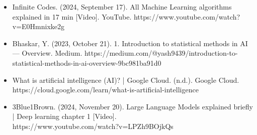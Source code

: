 \documentclass[a4paper]{article}
\begin{document}
\begin{itemize}
    \item Infinite Codes. (2024, September 17). All Machine Learning algorithms explained in 17 min [Video]. YouTube. https://www.youtube.com/watch?v=E0Hmnixke2g

    \item Bhaskar, Y. (2023, October 21). 1. Introduction to statistical methods in AI — Overview. Medium. https://medium.com/@yash9439/introduction-to-statistical-methods-in-ai-overview-9bc981ba91d0

    \item What is artificial intelligence (AI)? | Google Cloud. (n.d.). Google Cloud. \\ https://cloud.google.com/learn/what-is-artificial-intelligence

    \item 3Blue1Brown. (2024, November 20). Large Language Models explained briefly | Deep learning chapter 1 [Video]. \\ https://www.youtube.com/watch?v=LPZh9BOjkQs    
    
\end{itemize}
\end{document}
